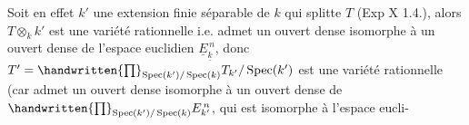 {{Soit en effet $k'$ une extension finie  séparable de $k$  qui splitte $T$ (Exp X 1.4.), alors  $T\otimes_k k'$ est une variété rationnelle i.e.  admet un ouvert dense isomorphe à un ouvert dense de l'espace euclidien $\underline E_{\underline k}^{\,n}$, donc $T'=\handwritten{\prod}_{\operatorname{Spec}(k')/\operatorname{Spec}(k)}T_{k'}/\operatorname{Spec}(k')$ est une variété rationnelle (car admet un ouvert dense isomorphe à un ouvert dense de $\handwritten{\prod}_{\operatorname{Spec}(k')/\operatorname{Spec}(k)}E_{k'}^{\,n}$, qui est isomorphe à l'espace  eucli-}}

